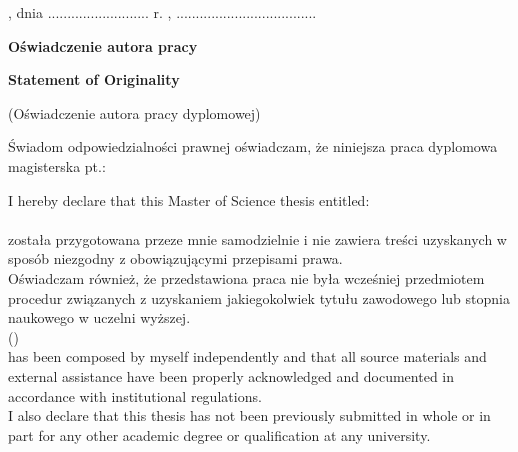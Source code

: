 \documentclass[12pt,a4paper,twoside]{report}
\begin{document}

\MakeThesisTitlePage
\MakeTULTitlesPage
\cleardoublepage

\thispagestyle{plain}
\vspace*{2cm}
\vspace*{1.5cm}
\begin{flushright}
    \ThesisCity, dnia .......................... r.
    \ThesisCity, ....................................
\end{flushright}
\vspace{1.5cm}
\vspace{1.0cm}
\begin{center}
    {\large\bfseries Oświadczenie autora pracy}\par
    {\Large\bfseries Statement of Originality}\par
    \vspace{0.2cm}
    {\small (Oświadczenie autora pracy dyplomowej)}\par
\end{center}
\vspace{1cm}
Świadom odpowiedzialności prawnej oświadczam, że niniejsza praca dyplomowa magisterska pt.:\\
\vspace{1.0cm}

\noindent
I hereby declare that this Master of Science thesis entitled:\\
\textbf{\ThesisTitle}\\
została przygotowana przeze mnie samodzielnie i nie zawiera treści uzyskanych w sposób niezgodny z obowiązującymi przepisami prawa.\\
Oświadczam również, że przedstawiona praca nie była wcześniej przedmiotem procedur związanych z uzyskaniem jakiegokolwiek tytułu zawodowego lub stopnia naukowego w uczelni wyższej.\\
\vspace{2.5cm}
(\textit{\ThesisTitlePL})\\
has been composed by myself independently and that all source materials and external assistance have been properly acknowledged and documented in accordance with institutional regulations.\\
I also declare that this thesis has not been previously submitted in whole or in part for any other academic degree or qualification at any university.
\end{document}

